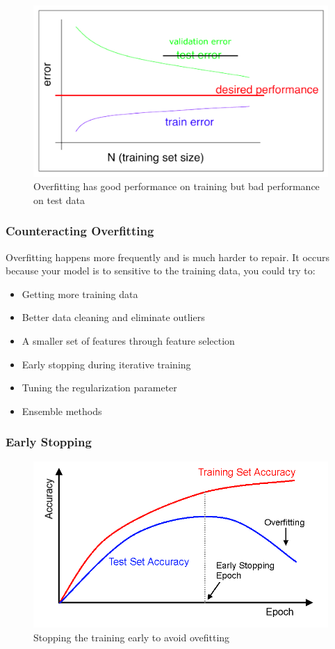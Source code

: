 \documentclass[11pt]{article}
\begin{document}
\begin{figure}[h!]
    \centering
    \includegraphics[width=0.7\linewidth, keepaspectratio]{Pictures/overfitting_learning_curve}
    \caption{Overfitting has good performance on training but bad performance on test data}
    \label{fig:overfittinglearningcurve}
\end{figure}

\subsubsection{Counteracting Overfitting}
Overfitting happens more frequently and is much harder to repair. It occurs because your model is to sensitive to the training data, you could try to:
\begin{itemize}
    \item Getting more training data
    \item Better data cleaning and eliminate outliers
    \item A smaller set of features through feature selection
    \item Early stopping during iterative training
    \item Tuning the regularization parameter
    \item Ensemble methods
\end{itemize}

\subsubsection{Early Stopping}

\begin{figure}[h!]
    \centering
    \includegraphics[width=0.6\linewidth, keepaspectratio]{Pictures/early_stopping}
    \caption{Stopping the training early to avoid ovefitting}
    \label{fig:earlystopping}
\end{figure}
\end{document}
